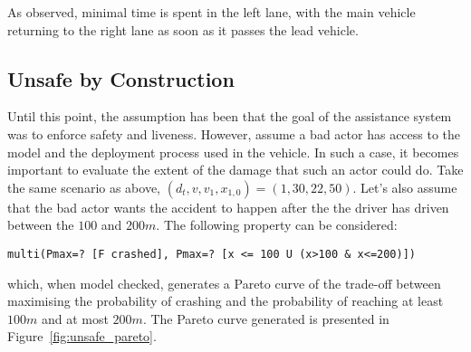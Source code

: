 As observed, minimal time is spent in the left lane, with the main vehicle returning to the right lane as soon as it passes the lead vehicle.

%
%
%

\subsection{Unsafe by Construction}

Until this point, the assumption has been that the goal of the assistance system was to enforce safety and liveness. However, assume a bad actor has access to the model and the deployment process used in the vehicle. In such a case, it becomes important to evaluate the extent of the damage that such an actor could do. Take the same scenario as above, $(d_t, v, v_1, x_{1,0}) = (1, 30, 22, 50)$. Let's also assume that the bad actor wants the accident to happen after the the driver has driven between the $100$ and $200m$. The following property can be considered:

\begin{minipage}{\linewidth}
{\vspace{1em}
\begin{lstlisting}
multi(Pmax=? [F crashed], Pmax=? [x <= 100 U (x>100 & x<=200)])
\end{lstlisting}
}
\end{minipage}

which, when model checked, generates a Pareto curve of the trade-off between maximising the probability of crashing and the probability of reaching at least $100m$ and at most $200m$. The Pareto curve generated is presented in Figure~\ref{fig:unsafe_pareto}.

